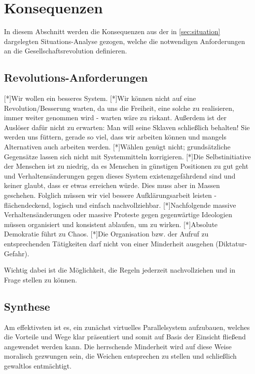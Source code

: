 \section{Konsequenzen}\label{sec:consequences}

In diesem Abschnitt werden die Konsequenzen aus der in \vref{sec:situation} dargelegten Situations-Analyse gezogen, welche die notwendigen Anforderungen an die Gesellschaftsrevolution definieren.

\subsection{Revolutions-Anforderungen}\label{sec:consequences/requirements}

[*]Wir wollen ein besseres System.
[*]Wir können nicht auf eine Revolution/Besserung warten, da uns die Freiheit, eine solche zu realisieren, immer weiter genommen wird - warten wäre zu riskant. Außerdem ist der Auslöser dafür nicht zu erwarten: Man will seine Sklaven schließlich behalten! Sie werden uns füttern, gerade so viel, dass wir arbeiten können und mangels Alternativen auch arbeiten werden.
[*]Wählen genügt nicht; grundsätzliche Gegensätze lassen sich nicht mit Systemmitteln korrigieren.
[*]Die Selbstinitiative der Menschen ist zu niedrig, da es Menschen in günstigen Positionen zu gut geht und Verhaltensänderungen gegen dieses System existenzgefährdend sind und keiner glaubt, dass er etwas erreichen würde. Dies muss aber in Massen geschehen. Folglich müssen wir viel bessere Aufklärungsarbeit leisten - flächendeckend, logisch und einfach nachvollziehbar.
[*]Nachfolgende massive Verhaltensänderungen oder massive Proteste gegen gegenwärtige Ideologien müssen organisiert und konsistent ablaufen, um zu wirken.
[*]Absolute Demokratie führt zu Chaos.
[*]Die Organisation bzw. der Aufruf zu entsprechenden Tätigkeiten darf nicht von einer Minderheit ausgehen (Diktatur-Gefahr).

Wichtig dabei ist die Möglichkeit, die Regeln jederzeit nachvollziehen und in Frage stellen zu können.

\subsection{Synthese}\label{sec:consequences/synthesis}

Am effektivsten ist es, ein zunächst virtuelles Parallelsystem aufzubauen, welches die Vorteile und Wege klar präsentiert und somit auf Basis der Einsicht fließend angewendet werden kann. Die herrschende Minderheit wird auf diese Weise moralisch gezwungen sein, die Weichen entsprechen zu stellen und schließlich gewaltlos entmächtigt.

